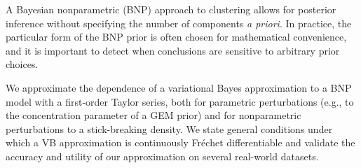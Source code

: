 A Bayesian nonparametric (BNP) approach to clustering allows for posterior
inference without specifying the number of components {\em a priori}.  In
practice, the particular form of the BNP prior is often chosen for mathematical
convenience, and it is important to detect when conclusions are sensitive to
arbitrary prior choices.

We approximate the dependence of a variational Bayes approximation to a BNP
model with a first-order Taylor series, both for parametric perturbations (e.g.,
to the concentration parameter of a GEM prior) and for nonparametric
perturbations to a stick-breaking density.  We state general conditions under
which a VB approximation is continuously Fr{\'e}chet differentiable and
validate the accuracy and utility of our approximation on several real-world
datasets.
